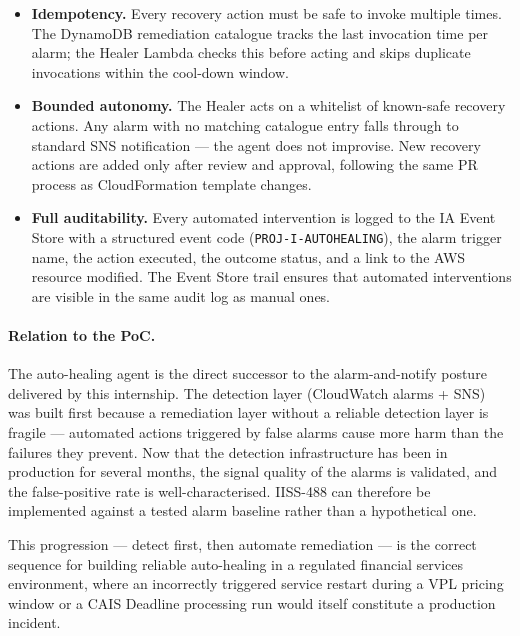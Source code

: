 \begin{itemize}
    \item \textbf{Idempotency.} Every recovery action must be safe to invoke
          multiple times. The DynamoDB remediation catalogue tracks the last
          invocation time per alarm; the Healer Lambda checks this before
          acting and skips duplicate invocations within the cool-down window.

    \item \textbf{Bounded autonomy.} The Healer acts on a whitelist of
          known-safe recovery actions. Any alarm with no matching catalogue
          entry falls through to standard SNS notification --- the agent
          does not improvise. New recovery actions are added only after
          review and approval, following the same PR process as
          CloudFormation template changes.

    \item \textbf{Full auditability.} Every automated intervention is
          logged to the IA Event Store with a structured event code
          (\texttt{PROJ-I-AUTOHEALING}), the alarm trigger name, the
          action executed, the outcome status, and a link to the AWS
          resource modified. The Event Store trail ensures that automated
          interventions are visible in the same audit log as manual ones.
\end{itemize}

\paragraph{Relation to the PoC.}
The auto-healing agent is the direct successor to the alarm-and-notify
posture delivered by this internship. The detection layer (CloudWatch
alarms + SNS) was built first because a remediation layer without a
reliable detection layer is fragile --- automated actions triggered by
false alarms cause more harm than the failures they prevent. Now that the
detection infrastructure has been in production for several months, the
signal quality of the alarms is validated, and the false-positive rate
is well-characterised. IISS-488 can therefore be implemented against a
tested alarm baseline rather than a hypothetical one.

This progression --- detect first, then automate remediation --- is the
correct sequence for building reliable auto-healing in a regulated financial
services environment, where an incorrectly triggered service restart during
a VPL pricing window or a CAIS Deadline processing run would itself
constitute a production incident.

